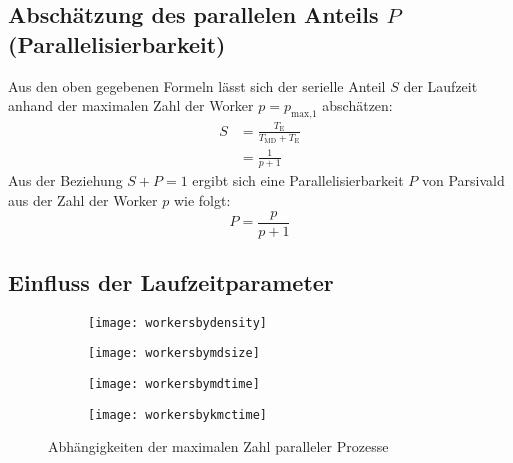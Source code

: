 \subsection{Abschätzung des parallelen Anteils $P$ (Parallelisierbarkeit)}

Aus den oben gegebenen Formeln lässt sich der serielle Anteil $S$ der Laufzeit anhand der maximalen Zahl der Worker $p = p_\text{max,1}$ abschätzen:
\begin{align}
  S & = \frac{T_\text{E}}{T_\text{MD} + T_\text{E}} \\
    & = \frac{1}{p + 1}
\end{align}
Aus der Beziehung $S + P = 1$ ergibt sich eine Parallelisierbarkeit $P$ von Parsivald aus der Zahl der Worker $p$ wie folgt:
\begin{equation}
  P = \frac{p}{p+1}
\end{equation}


\subsection{Einfluss der Laufzeitparameter}


\begin{figure}[p]
  
  \captionsetup[subfigure]{singlelinecheck=false}
  \def\subfigwidth{7cm}
  \begin{subfigure}[t]{\subfigwidth}
    \texttt{[image: workersbydensity]}
  \end{subfigure}
  \hfill
  \begin{subfigure}[t]{\subfigwidth}
    \texttt{[image: workersbymdsize]}
  \end{subfigure}

  \begin{subfigure}[t]{\subfigwidth}
    \texttt{[image: workersbymdtime]}
  \end{subfigure}
  \hfill
  \begin{subfigure}[t]{\subfigwidth}
    \texttt{[image: workersbykmctime]}
  \end{subfigure}
  \hfill

  \caption{Abhängigkeiten der maximalen Zahl paralleler Prozesse}
  
\end{figure}

